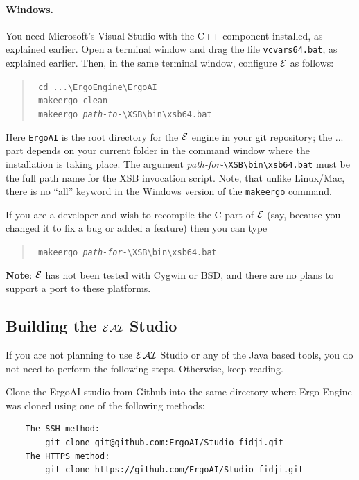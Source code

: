 \documentclass[11pt]{article}
\newcommand{\ERGO}{\mbox{\ensuremath{\cal{E}}\smaller{{\sc{RGO}}}}\xspace}
\newcommand{\ERGOAI}{\mbox{{\ensuremath{\cal{E}}\smaller{{\sc{RGO}}}}\ensuremath{\cal{AI}}}\xspace}
\newcommand{\FLSYSTEM}{\ERGO}
\newcommand{\bs}{\textbackslash}
\begin{document}
\paragraph{Windows.}
You need Microsoft's Visual Studio with the C++ component installed,
as explained earlier.
Open a terminal window and drag the file
\texttt{vcvars64.bat}, as explained earlier.
Then, in the same terminal window, configure \FLSYSTEM as follows:
\begin{quote}
  \tt
   cd ...\bs{}ErgoEngine\bs{}ErgoAI\\
   \tt
   makeergo clean\\
   \tt
   makeergo \textnormal{\emph{path-to-}}{\bs}XSB{\bs}bin{\bs}xsb64.bat
\end{quote}
Here \texttt{ErgoAI}  is the root directory 
for the \FLSYSTEM engine in your git repository; the ... part depends on
your current folder in the command window where the installation is taking
place. The argument
\textnormal{\emph{path-for-}}\texttt{{\bs}XSB{\bs}bin{\bs}xsb64.bat}
must be the full path name for the XSB invocation script.
Note, that unlike Linux/Mac, there is no ``all'' keyword
in the Windows version of the \texttt{makeergo} command.

If you are a developer and wish to recompile the C part of \FLSYSTEM
(say, because you changed it to fix a bug or added a feature)
then you can type
\begin{quote}
\tt
   makeergo \textnormal{\emph{path-for-}}{\bs}XSB{\bs}bin{\bs}xsb64.bat
\end{quote}

\textbf{Note}: \FLSYSTEM has not been tested with Cygwin or BSD,
and there are no
plans to support a port to these platforms.

\subsection{Building the \ERGOAI Studio}

If you are not planning to use \ERGOAI Studio
or any of the Java based tools, you do not need to perform the following
steps. Otherwise, keep reading.

Clone the ErgoAI studio from Github into the same directory where
Ergo Engine was cloned using one of the following methods:
\begin{verbatim}
    The SSH method:
        git clone git@github.com:ErgoAI/Studio_fidji.git
    The HTTPS method:
        git clone https://github.com/ErgoAI/Studio_fidji.git
\end{verbatim}
\end{document}
